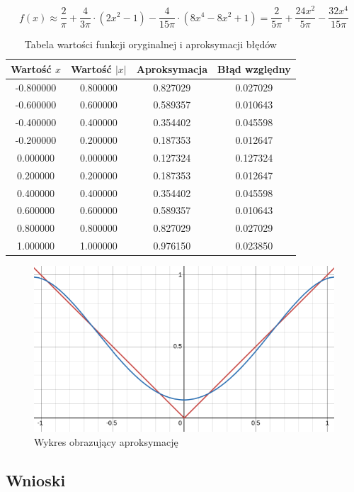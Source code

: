 \documentclass{article}
\begin{document}
\begin{equation}
    f(x) \approx \frac{2}{\pi} + \frac{4}{3\pi} \cdot (2x^2 - 1)  - \frac{4}{15 \pi} \cdot (8x^4 -  8x^2 + 1) = \frac{2}{5 \pi} + \frac{24 x^2}{5 \pi} - \frac{32 x^4}{15 \pi}
 \end{equation}

\begin{table}[]
    \centering
    \begin{tabular}{c|c|c|c}
    Wartość $x$ & Wartość $|x|$ & Aproksymacja & Błąd względny \\
    \hline
         -0.800000 & 0.800000 & 0.827029 & 0.027029 \\ 
-0.600000 & 0.600000 & 0.589357 & 0.010643 \\
-0.400000 & 0.400000 & 0.354402 & 0.045598 \\
-0.200000 & 0.200000 & 0.187353 & 0.012647 \\
 0.000000 & 0.000000 & 0.127324 & 0.127324 \\
 0.200000 & 0.200000 & 0.187353 & 0.012647 \\
 0.400000 & 0.400000 & 0.354402 & 0.045598 \\
 0.600000 & 0.600000 & 0.589357 & 0.010643 \\
 0.800000 & 0.800000 & 0.827029 & 0.027029 \\
 1.000000 & 1.000000 & 0.976150 & 0.023850 \\

    \end{tabular}
    \caption{Tabela wartości funkcji oryginalnej i aproksymacji błędów}
    \label{tab:comparison}
\end{table}


\begin{figure}[H]
    \centering
    \includegraphics[width=0.5\linewidth]{Aproksymacja_x.png}
    \caption{Wykres obrazujący aproksymację}
    \label{fig:aprox}
\end{figure}

\subsection*{Wnioski}
\end{document}
